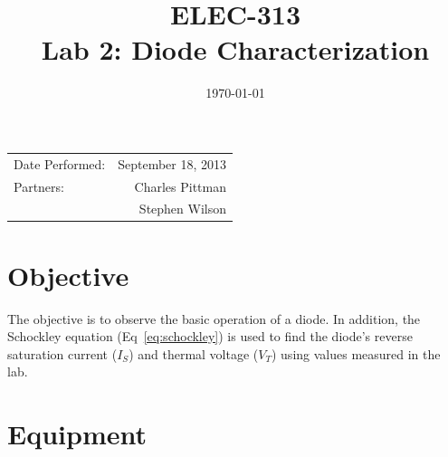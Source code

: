 \documentclass{article}
\author{}
\title{ELEC-313 \\ Lab 2: Diode Characterization \\ }
\date{\today}
\begin{document}
\maketitle

\begin{center}
  \begin{tabular}{lr}
    Date Performed: & September 18, 2013 \\
    Partners: & Charles Pittman \\
    & Stephen Wilson \\
  \end{tabular}
\end{center}

\newpage

\tableofcontents
\listoffigures
\listoftables

\newpage


\renewcommand{\labelenumi}{\alph{enumi}.}

\section{Objective}
\label{sec:objective}

The objective is to observe the basic operation of a diode.  In
addition, the Schockley equation (Eq~\ref{eq:schockley}) is used to
find the diode's reverse saturation current ($I_S$) and thermal
voltage ($V_T$) using values measured in the lab.

\section{Equipment}
\label{sec:equipment}

\end{document}
